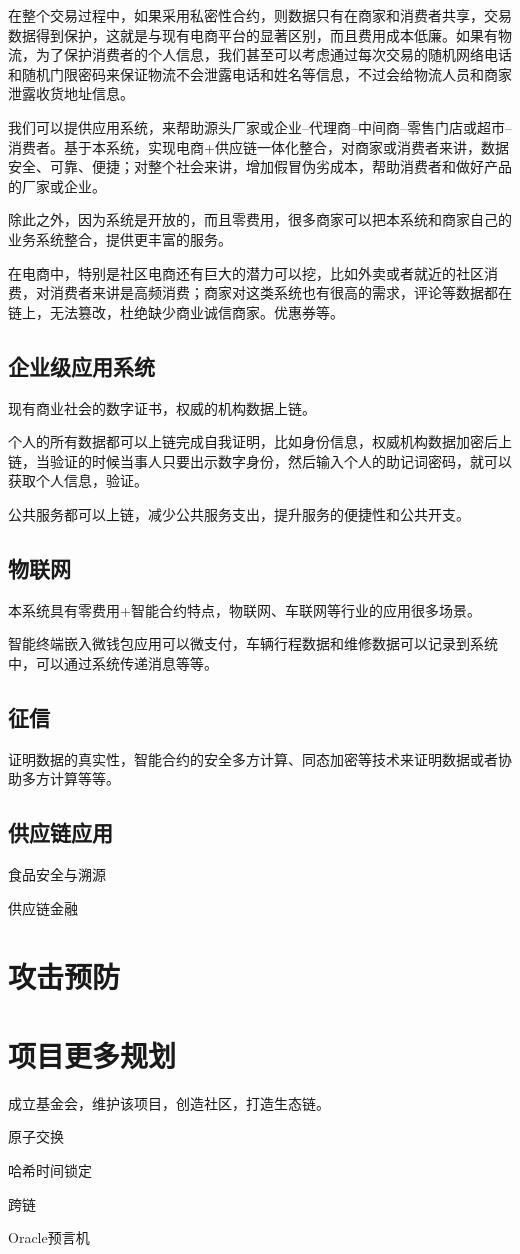 \documentclass[UTF8]{ctexart}
\begin{document}
在整个交易过程中，如果采用私密性合约，则数据只有在商家和消费者共享，交易数据得到保护，这就是与现有电商平台的显著区别，而且费用成本低廉。如果有物流，为了保护消费者的个人信息，我们甚至可以考虑通过每次交易的随机网络电话和随机门限密码来保证物流不会泄露电话和姓名等信息，不过会给物流人员和商家泄露收货地址信息。

我们可以提供应用系统，来帮助源头厂家或企业--代理商--中间商--零售门店或超市--消费者。基于本系统，实现电商+供应链一体化整合，对商家或消费者来讲，数据安全、可靠、便捷；对整个社会来讲，增加假冒伪劣成本，帮助消费者和做好产品的厂家或企业。

除此之外，因为系统是开放的，而且零费用，很多商家可以把本系统和商家自己的业务系统整合，提供更丰富的服务。

在电商中，特别是社区电商还有巨大的潜力可以挖，比如外卖或者就近的社区消费，对消费者来讲是高频消费；商家对这类系统也有很高的需求，评论等数据都在链上，无法篡改，杜绝缺少商业诚信商家。优惠券等。

\subsection{企业级应用系统}

现有商业社会的数字证书，权威的机构数据上链。

个人的所有数据都可以上链完成自我证明，比如身份信息，权威机构数据加密后上链，当验证的时候当事人只要出示数字身份，然后输入个人的助记词密码，就可以获取个人信息，验证。

公共服务都可以上链，减少公共服务支出，提升服务的便捷性和公共开支。

\subsection{物联网}

本系统具有零费用+智能合约特点，物联网、车联网等行业的应用很多场景。

智能终端嵌入微钱包应用可以微支付，车辆行程数据和维修数据可以记录到系统中，可以通过系统传递消息等等。

\subsection{征信}

证明数据的真实性，智能合约的安全多方计算、同态加密等技术来证明数据或者协助多方计算等等。

\subsection{供应链应用}

食品安全与溯源

供应链金融

\section{攻击预防} 

\section{项目更多规划}

成立基金会，维护该项目，创造社区，打造生态链。

原子交换

哈希时间锁定

跨链

Oracle预言机


\end{document}
